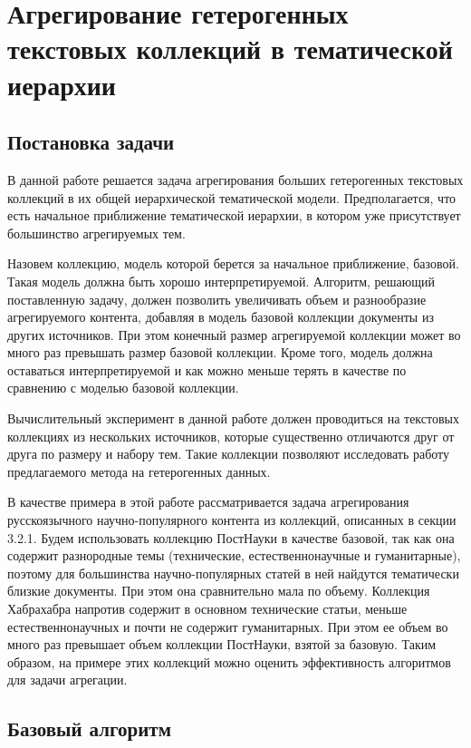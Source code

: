 \chapter{Агрегирование гетерогенных текстовых коллекций в тематической иерархии}
\section{Постановка задачи}

В данной работе решается задача агрегирования больших гетерогенных текстовых коллекций в их общей иерархической тематической модели.
Предполагается, что есть начальное приближение тематической иерархии, в котором уже присутствует большинство агрегируемых тем. 

Назовем коллекцию, модель которой берется за начальное приближение, базовой. Такая модель должна быть хорошо интерпретируемой.
Алгоритм, решающий поставленную задачу, должен позволить увеличивать объем и разнообразие агрегируемого контента, добавляя в модель базовой коллекции документы из других источников. При этом конечный размер агрегируемой коллекции может во много раз превышать размер базовой коллекции. Кроме того, модель должна оставаться интерпретируемой и как можно меньше терять в качестве по сравнению с моделью базовой коллекции. 

Вычислительный эксперимент в данной работе должен проводиться на текстовых коллекциях из нескольких источников, которые существенно отличаются друг от друга по размеру и набору тем. Такие коллекции позволяют исследовать работу предлагаемого метода на гетерогенных данных.

В качестве примера в этой работе рассматривается задача агрегирования русскоязычного научно-популярного контента из коллекций, описанных в секции 3.2.1.
 Будем использовать коллекцию ПостНауки в качестве базовой, так как она содержит разнородные темы (технические, естественнонаучные и гуманитарные), поэтому для большинства научно-популярных статей в ней найдутся тематически близкие документы. При этом она сравнительно мала по объему.
Коллекция Хабрахабра напротив содержит в основном технические статьи, меньше естественнонаучных и почти не содержит гуманитарных. При этом ее объем во много раз превышает объем коллекции ПостНауки, взятой за базовую. Таким образом, на примере этих коллекций можно оценить эффективность алгоритмов для задачи агрегации.

\section{Базовый алгоритм}

